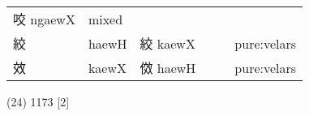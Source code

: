 \documentclass[14pt,a4paper]{scrartcl}
\begin{document}
\begin{longtable}[c]{@{}llllll@{}}
\begin{minipage}[t]{0.14\columnwidth}
咬 ngaewX
\strut\end{minipage} &
\begin{minipage}[t]{0.14\columnwidth}\raggedright\strut
mixed
\strut\end{minipage}\tabularnewline
\begin{minipage}[t]{0.14\columnwidth}\raggedright\strut
絞
\strut\end{minipage} &
\begin{minipage}[t]{0.14\columnwidth}\raggedright\strut
haewH
\strut\end{minipage} &
\begin{minipage}[t]{0.14\columnwidth}\raggedright\strut
絞 kaewX
\strut\end{minipage} &
\begin{minipage}[t]{0.14\columnwidth}\raggedright\strut
\strut\end{minipage} &
\begin{minipage}[t]{0.14\columnwidth}\raggedright\strut
\strut\end{minipage} &
\begin{minipage}[t]{0.14\columnwidth}\raggedright\strut
pure:velars
\strut\end{minipage}\tabularnewline
\begin{minipage}[t]{0.14\columnwidth}\raggedright\strut
效
\strut\end{minipage} &
\begin{minipage}[t]{0.14\columnwidth}\raggedright\strut
kaewX
\strut\end{minipage} &
\begin{minipage}[t]{0.14\columnwidth}\raggedright\strut
傚 haewH
\strut\end{minipage} &
\begin{minipage}[t]{0.14\columnwidth}\raggedright\strut
\strut\end{minipage} &
\begin{minipage}[t]{0.14\columnwidth}\raggedright\strut
\strut\end{minipage} &
\begin{minipage}[t]{0.14\columnwidth}\raggedright\strut
pure:velars
\strut\end{minipage}\tabularnewline
\bottomrule
\end{longtable}

(24) 1173 {[}2{]}
\end{document}
